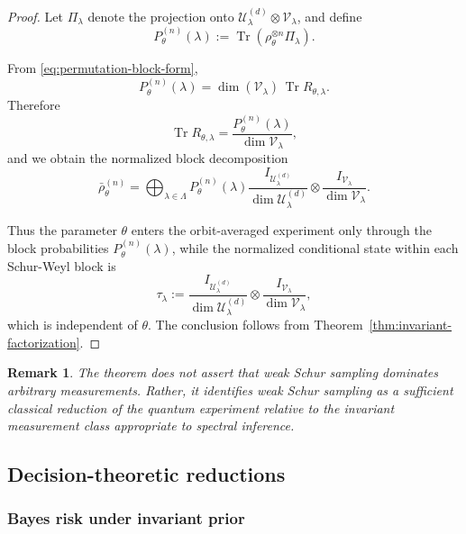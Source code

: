 \documentclass{article}
\newtheorem{remark}{Remark}
\theoremstyle{named}
\theoremstyle{named1}
\newcommand{\Tr}{\operatorname{Tr}}
\theoremstyle{plain}
\theoremstyle{remark}
\begin{document}
\begin{proof}
Let $\Pi_\lambda$ denote the projection onto
$\mathcal U_\lambda^{(d)}\otimes\mathcal V_\lambda$, and define
\[
    P_\theta^{(n)}(\lambda)
    :=
    \Tr\!\left(
        \rho_\theta^{\otimes n}\Pi_\lambda
    \right).
\]


From \eqref{eq:permutation-block-form},
\[
    P_\theta^{(n)}(\lambda)
    =
    \dim(\mathcal V_\lambda)\,
    \Tr R_{\theta,\lambda}.
\]
Therefore
\[
    \Tr R_{\theta,\lambda}
    =
    \frac{P_\theta^{(n)}(\lambda)}
         {\dim\mathcal V_\lambda},
\]
and we obtain the normalized block decomposition
\begin{equation}
\label{eq:wss-block-factorization}
    \bar\rho_\theta^{(n)}
    =
    \bigoplus_{\lambda\in\Lambda}
    P_\theta^{(n)}(\lambda)
    \frac{I_{\mathcal U_\lambda^{(d)}}}
         {\dim\mathcal U_\lambda^{(d)}}
    \otimes
    \frac{I_{\mathcal V_\lambda}}
         {\dim\mathcal V_\lambda}.
\end{equation}

Thus the parameter $\theta$ enters the orbit-averaged experiment only
through the block probabilities $P_\theta^{(n)}(\lambda)$, while the
normalized conditional state within each Schur-Weyl block is
\[
    \tau_\lambda
    :=
    \frac{I_{\mathcal U_\lambda^{(d)}}}
         {\dim\mathcal U_\lambda^{(d)}}
    \otimes
    \frac{I_{\mathcal V_\lambda}}
         {\dim\mathcal V_\lambda},
\]
which is independent of $\theta$. The conclusion follows from
Theorem~\ref{thm:invariant-factorization}.
\end{proof}







\begin{remark}
The theorem does not assert
that weak Schur sampling dominates arbitrary  measurements.
Rather, it identifies weak Schur sampling as a sufficient classical
reduction of the quantum experiment relative to the invariant measurement
class appropriate to spectral inference.
\end{remark}

\subsection{Decision-theoretic reductions}


\subsubsection{Bayes risk under invariant prior}
\end{document}

